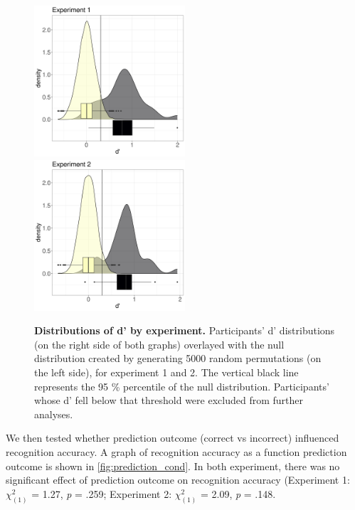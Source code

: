 \documentclass[a4paper,12pt]{article}
\begin{document}
\begin{figure}[ht!]
{\includegraphics[width=0.5\textwidth]{figures/dprime_exp1.png}} \hfill
{\includegraphics[width=0.5\textwidth]{figures/dprime_exp2.png}} 
\caption{\textbf{Distributions of d' by experiment.} Participants' d' distributions (on the right side of both graphs) overlayed with the null distribution created by generating 5000 random permutations (on the left side), for experiment 1 and 2. The vertical black line represents the 95 \% percentile of the null distribution. Participants' whose d' fell below that threshold were excluded from further analyses.}
\label{fig:dprime}
\end{figure}

We then tested whether prediction outcome (correct vs incorrect) influenced recognition accuracy. A graph of recognition accuracy as a function prediction outcome is shown in \ref{fig:prediction_cond}. In both experiment, there was no significant effect of prediction outcome on recognition accuracy (Experiment 1: $\chi^2_{(1)}$ = 1.27, \textit{p} = .259; Experiment 2: $\chi^2_{(1)}$ = 2.09, \textit{p} = .148.
\end{document}
